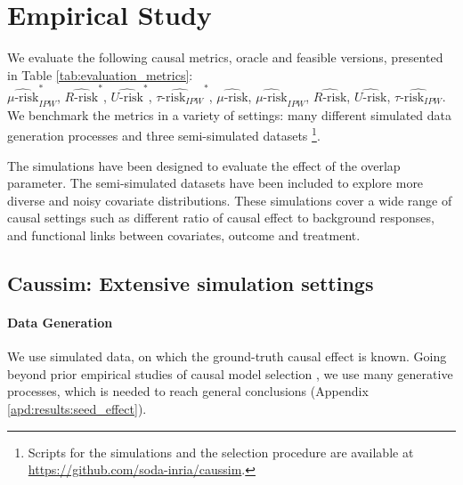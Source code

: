 \documentclass[a4paper,num-refs]{oup-contemporary}%
\begin{document}
\section{Empirical Study}\label{sec:empirical_study}


We evaluate the following causal metrics, oracle and feasible
versions, presented in Table
\ref{tab:evaluation_metrics}:\\
$\widehat{\mu\text{-risk}}_{IPW}^*$,
$\widehat{R\text{-risk}}^*$,
$\widehat{U\text{-risk}}^*$,
$\widehat{\tau\text{-risk}_{IPW}}^*$,
$\widehat{\mu\text{-risk}}$,
$\widehat{\mu\text{-risk}}_{IPW}$,
$\widehat{R\text{-risk}}$,
$\widehat{U\text{-risk}}$,
$\widehat{\tau\text{-risk}_{IPW}}$.
We benchmark the metrics in a variety of settings:
many different simulated data generation
processes and three semi-simulated datasets \footnote{Scripts for the simulations and the selection procedure are available at
    \url{https://github.com/soda-inria/caussim}.
}.

The simulations have been designed to evaluate the effect of the overlap parameter. The semi-simulated datasets have been included to explore more diverse and noisy covariate distributions. These simulations cover a wide range of causal settings such as different ratio of causal effect to background responses, and functional links between covariates, outcome and treatment.

\subsection{Caussim: Extensive simulation settings}\label{subsec:simulations}

\paragraph{Data Generation}

We use simulated data, on which the ground-truth causal effect is known. Going
beyond prior empirical studies of causal model selection
\cite{schuler_comparison_2018,alaa_validating_2019}, we use many
generative processes, which is needed to reach general conclusions (Appendix \ref{apd:results:seed_effect}).
\end{document}
